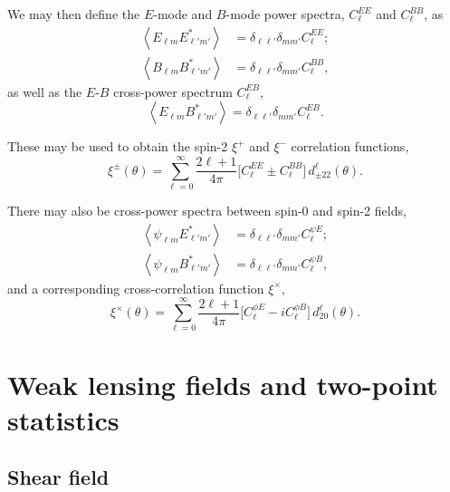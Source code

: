 We may then define the $E$-mode and $B$-mode power spectra, $C_\ell^{EE}$ and $C_\ell^{BB}$, as
\begin{align}
\left\langle E_{\ell m} E^*_{\ell' m'} \right\rangle
&= \delta_{\ell \ell'} \delta_{m m'} C_\ell^{EE};
\\[1em]
\left\langle B_{\ell m} B^*_{\ell' m'} \right\rangle
&= \delta_{\ell \ell'} \delta_{m m'} C_\ell^{BB},
\end{align}
as well as the $E$-$B$ cross-power spectrum $C_\ell^{EB}$,
\begin{equation}
\left\langle E_{\ell m} B^*_{\ell' m'} \right\rangle
= \delta_{\ell \ell'} \delta_{m m'} C_\ell^{EB}.
\end{equation}

These may be used to obtain the spin-2 $\xi^+$ and $\xi^-$ correlation functions,
\begin{equation}
\xi^\pm \left( \theta \right) = \sum_{\ell = 0}^\infty {
\frac{2 \ell + 1}{4 \pi}
\Big[ C_\ell^{EE} \pm C_\ell^{BB} \Big] \,
d^\ell_{\pm 2 2} \left( \theta \right) }.
\end{equation}

There may also be cross-power spectra between spin-0 and spin-2 fields,
\begin{align}
\left\langle \psi_{\ell m} E^*_{\ell' m'} \right\rangle
&= \delta_{\ell \ell'} \delta_{m m'} C_\ell^{\psi E};
\\[1em]
\left\langle \psi_{\ell m} B^*_{\ell' m'} \right\rangle
&= \delta_{\ell \ell'} \delta_{m m'} C_\ell^{\psi B},
\end{align}
and a corresponding cross-correlation function $\xi^\times$,
\begin{equation}
\xi^\times \left( \theta \right) = \sum_{\ell = 0}^\infty {
\frac{2 \ell + 1}{4 \pi}
\Big[ C_\ell^{\phi E} - i C_\ell^{\phi B} \Big] \,
d^\ell_{2 0} \left( \theta \right) }.
\end{equation}

\section{Weak lensing fields and two-point statistics}
\label{est_Sec:wl_fields}

\subsection{Shear field}

